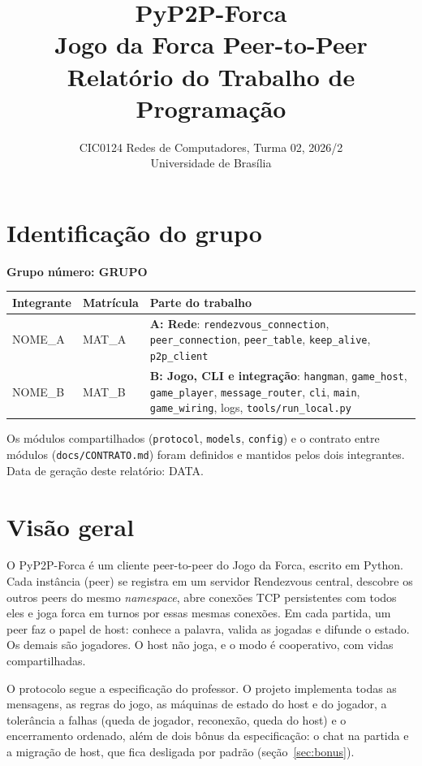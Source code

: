 \documentclass[11pt,a4paper]{article}
\title{PyP2P-Forca\\[4pt]\large Jogo da Forca Peer-to-Peer\\Relatório do Trabalho de Programação}
\author{CIC0124 Redes de Computadores, Turma 02, 2026/2\\Universidade de Brasília}
\date{}
\begin{document}
\maketitle
\vspace{-1.5em}

\section{Identificação do grupo}
\textbf{Grupo número: {{GRUPO}}}

\begin{tabularx}{\textwidth}{@{}P{4.2cm}P{2cm}Y@{}}
\toprule
\textbf{Integrante} & \textbf{Matrícula} & \textbf{Parte do trabalho}\\
\midrule
{{NOME_A}} & {{MAT_A}} & \textbf{A: Rede}: \texttt{rendezvous\_connection}, \texttt{peer\_connection}, \texttt{peer\_table}, \texttt{keep\_alive}, \texttt{p2p\_client}\\
{{NOME_B}} & {{MAT_B}} & \textbf{B: Jogo, CLI e integração}: \texttt{hangman}, \texttt{game\_host}, \texttt{game\_player}, \texttt{message\_router}, \texttt{cli}, \texttt{main}, \texttt{game\_wiring}, logs, \texttt{tools/run\_local.py}\\
\bottomrule
\end{tabularx}

{\small Os módulos compartilhados (\texttt{protocol}, \texttt{models}, \texttt{config}) e o contrato entre módulos (\texttt{docs/CONTRATO.md}) foram definidos e mantidos pelos dois integrantes. Data de geração deste relatório: {{DATA}}.}

\section{Visão geral}
O PyP2P-Forca é um cliente peer-to-peer do Jogo da Forca, escrito em Python. Cada instância (peer) se registra em um servidor Rendezvous central, descobre os outros peers do mesmo \emph{namespace}, abre conexões TCP persistentes com todos eles e joga forca em turnos por essas mesmas conexões. Em cada partida, um peer faz o papel de host: conhece a palavra, valida as jogadas e difunde o estado. Os demais são jogadores. O host não joga, e o modo é cooperativo, com vidas compartilhadas.

O protocolo segue a especificação do professor. O projeto implementa todas as mensagens, as regras do jogo, as máquinas de estado do host e do jogador, a tolerância a falhas (queda de jogador, reconexão, queda do host) e o encerramento ordenado, além de dois bônus da especificação: o chat na partida e a migração de host, que fica desligada por padrão (seção~\ref{sec:bonus}).
\end{document}
